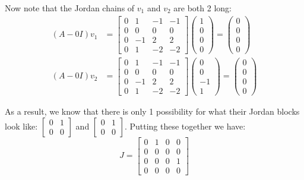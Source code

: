 \documentclass{article}
\begin{document}
Now note that the Jordan chains of $v_1$ and $v_2$ are both 2 long:
\begin{align*}
  (A-0I)v_1&=\begin{bmatrix}0&1&-1&-1\\ 0&0&0&0\\ 0&-1&2&2\\ 0&1&-2&-2\end{bmatrix}\begin{pmatrix}1\\ 0\\ 0\\ 0\end{pmatrix}=\begin{pmatrix}0\\ 0\\ 0\\ 0\end{pmatrix}\\
  (A-0I)v_2&=\begin{bmatrix}0&1&-1&-1\\ 0&0&0&0\\ 0&-1&2&2\\ 0&1&-2&-2\end{bmatrix}\begin{pmatrix}0\\ 0\\ -1\\ 1\end{pmatrix}=\begin{pmatrix}0\\ 0\\ 0\\ 0\end{pmatrix}
\end{align*}

As a result, we know that there is only 1 possibility for what their Jordan blocks look like: $\begin{bmatrix}0&1\\0&0\end{bmatrix}$ and $\begin{bmatrix}0&1\\0&0\end{bmatrix}$. Putting these together we have:
$$J=\begin{bmatrix}
  0&1&0&0\\0&0&0&0\\0&0&0&1\\0&0&0&0
\end{bmatrix}$$
\end{document}
